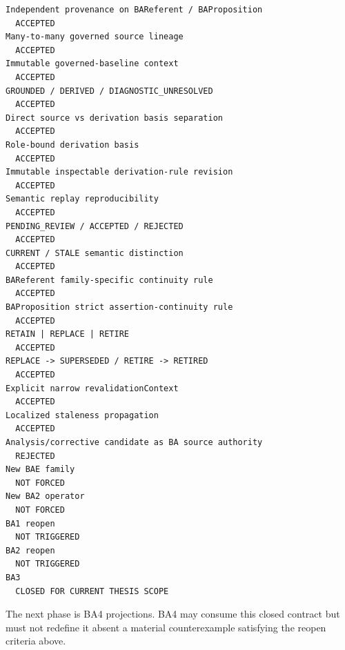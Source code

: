 \documentclass[11pt,a4paper]{article}
\begin{document}
\begin{verbatim}
Independent provenance on BAReferent / BAProposition
  ACCEPTED
Many-to-many governed source lineage
  ACCEPTED
Immutable governed-baseline context
  ACCEPTED
GROUNDED / DERIVED / DIAGNOSTIC_UNRESOLVED
  ACCEPTED
Direct source vs derivation basis separation
  ACCEPTED
Role-bound derivation basis
  ACCEPTED
Immutable inspectable derivation-rule revision
  ACCEPTED
Semantic replay reproducibility
  ACCEPTED
PENDING_REVIEW / ACCEPTED / REJECTED
  ACCEPTED
CURRENT / STALE semantic distinction
  ACCEPTED
BAReferent family-specific continuity rule
  ACCEPTED
BAProposition strict assertion-continuity rule
  ACCEPTED
RETAIN | REPLACE | RETIRE
  ACCEPTED
REPLACE -> SUPERSEDED / RETIRE -> RETIRED
  ACCEPTED
Explicit narrow revalidationContext
  ACCEPTED
Localized staleness propagation
  ACCEPTED
Analysis/corrective candidate as BA source authority
  REJECTED
New BAE family
  NOT FORCED
New BA2 operator
  NOT FORCED
BA1 reopen
  NOT TRIGGERED
BA2 reopen
  NOT TRIGGERED
BA3
  CLOSED FOR CURRENT THESIS SCOPE
\end{verbatim}

The next phase is BA4 projections. BA4 may consume this closed contract but must not redefine it absent a material counterexample satisfying the reopen criteria above.
\end{document}
